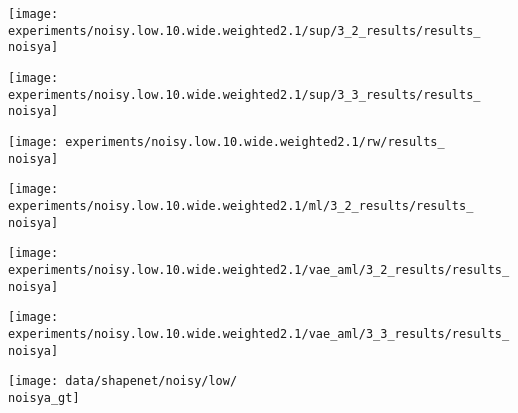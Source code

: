 \begin{minipage}[t]{0.1\textwidth}
    \vspace{0px}\centering
    \texttt{[image: experiments/noisy.low.10.wide.weighted2.1/sup/3\_2\_results/results\_\\noisya]}
\end{minipage}
\begin{minipage}[t]{0.1\textwidth}
    \vspace{0px}\centering
    \texttt{[image: experiments/noisy.low.10.wide.weighted2.1/sup/3\_3\_results/results\_\\noisya]}
\end{minipage}
\begin{minipage}[t]{0.1\textwidth}
    \vspace{0px}\centering
    \texttt{[image: experiments/noisy.low.10.wide.weighted2.1/rw/results\_\\noisya]}
\end{minipage}
\begin{minipage}[t]{0.1\textwidth}
    \vspace{0px}\centering
    \texttt{[image: experiments/noisy.low.10.wide.weighted2.1/ml/3\_2\_results/results\_\\noisya]}
\end{minipage}
\begin{minipage}[t]{0.1\textwidth}
    \vspace{0px}\centering
    \texttt{[image: experiments/noisy.low.10.wide.weighted2.1/vae\_aml/3\_2\_results/results\_\\noisya]}
\end{minipage}
\begin{minipage}[t]{0.1\textwidth}
    \vspace{0px}\centering
    \texttt{[image: experiments/noisy.low.10.wide.weighted2.1/vae\_aml/3\_3\_results/results\_\\noisya]}
\end{minipage}
\begin{minipage}[t]{0.1\textwidth}
    \vspace{0px}\centering
    \texttt{[image: data/shapenet/noisy/low/\\noisya\_gt]}
\end{minipage}
